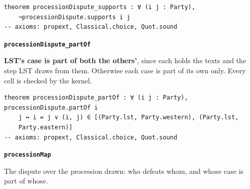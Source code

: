 \documentclass[11pt,paper=\testimonypaper,DIV=13,parskip=false]{scrartcl}
\begin{document}
{\small\begin{verbatim}
theorem processionDispute_supports : ∀ (i j : Party),
    ¬processionDispute.supports i j
-- axioms: propext, Classical.choice, Quot.sound
\end{verbatim}}
\par\medskip\noindent\textbf{\texttt{procession\allowbreak{}Dispute\_\allowbreak{}part\allowbreak{}Of}}\par\nobreak\noindent
\textbf{LST’s case is part of both the others’}, since each holds the texts and the step LST draws from them. Otherwise each case is part of its own only. Every cell is checked by the kernel.

{\small\begin{verbatim}
theorem processionDispute_partOf : ∀ (i j : Party), processionDispute.partOf i
    j ↔ i = j ∨ (i, j) ∈ [(Party.lst, Party.western), (Party.lst,
    Party.eastern)]
-- axioms: propext, Classical.choice, Quot.sound
\end{verbatim}}
\par\medskip\noindent\textbf{\texttt{procession\allowbreak{}Map}}\par\nobreak\noindent
The dispute over the procession drawn: who defeats whom, and whose case is part of whose.
\end{document}
